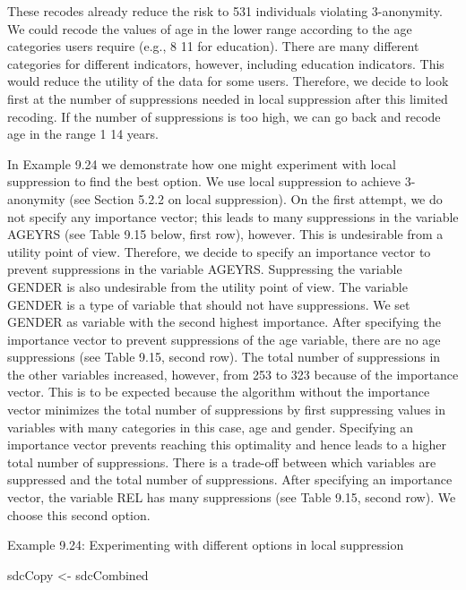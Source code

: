 \documentclass[letterpaper,10pt,english]{sphinxmanual}
\begin{document}
These recodes already reduce the risk to 531 individuals violating
3-anonymity. We could recode the values of age in the lower range
according to the age categories users require (e.g., 8 \textendash{} 11 for
education). There are many different categories for different
indicators, however, including education indicators. This would reduce
the utility of the data for some users. Therefore, we decide to look
first at the number of suppressions needed in local suppression after
this limited recoding. If the number of suppressions is too high, we can
go back and recode age in the range 1 \textendash{} 14 years.

In Example 9.24 we demonstrate how one might experiment with local
suppression to find the best option. We use local suppression to achieve
3-anonymity (see Section 5.2.2 on local suppression). On the first
attempt, we do not specify any importance vector; this leads to many
suppressions in the variable AGEYRS (see Table 9.15 below, first row),
however. This is undesirable from a utility point of view. Therefore, we
decide to specify an importance vector to prevent suppressions in the
variable AGEYRS. Suppressing the variable GENDER is also undesirable
from the utility point of view. The variable GENDER is a type of
variable that should not have suppressions. We set GENDER as variable
with the second highest importance. After specifying the importance
vector to prevent suppressions of the age variable, there are no age
suppressions (see Table 9.15, second row). The total number of
suppressions in the other variables increased, however, from 253 to 323
because of the importance vector. This is to be expected because the
algorithm without the importance vector minimizes the total number of
suppressions by first suppressing values in variables with many
categories \textendash{} in this case, age and gender. Specifying an importance
vector prevents reaching this optimality and hence leads to a higher
total number of suppressions. There is a trade-off between which
variables are suppressed and the total number of suppressions. After
specifying an importance vector, the variable REL has many suppressions
(see Table 9.15, second row). We choose this second option.

Example 9.24: Experimenting with different options in local suppression

\begin{DUlineblock}{0em}
\item[] 
\item[] sdcCopy \textless{}- sdcCombined
\end{DUlineblock}
\end{document}
